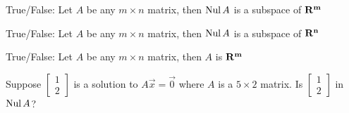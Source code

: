 \documentclass{ximera}
\newcommand{\RR}{\bf R}
\newcommand{\Nul}{\mathop{\rm Nul}}
\begin{document}
         \begin{question} True/False: Let $A$ be any $m\times n$ matrix, then $\Nul A$ is a subspace of $\RR^m$
         	
         	\begin{multipleChoice}
         	\end{multipleChoice}
         	
         \end{question}	
          \begin{question} True/False: Let $A$ be any $m\times n$ matrix, then $\Nul A$ is a subspace of $\RR^n$
          	
          	\begin{multipleChoice}
          		\choice[correct]{True}
          		\choice{False}
          	\end{multipleChoice}
          	
          \end{question}	
           \begin{question} True/False: Let $A$ be any $m\times n$ matrix, then  $A$ is $\RR^m$
           	
           	\begin{multipleChoice}
           	\end{multipleChoice}
           	
           \end{question}	
            \begin{question} Suppose $\begin{bmatrix} 1\\2\end{bmatrix}$ is a solution to
	    $A\vec{x} = \vec{0}$ where $A$ is a $5\times 2$ matrix. Is $\begin{bmatrix}
	    1\\2\end{bmatrix}$ in $\Nul A$? 
            	
            	\begin{multipleChoice}
            	\end{multipleChoice}
            	
            \end{question}	
\end{document}
